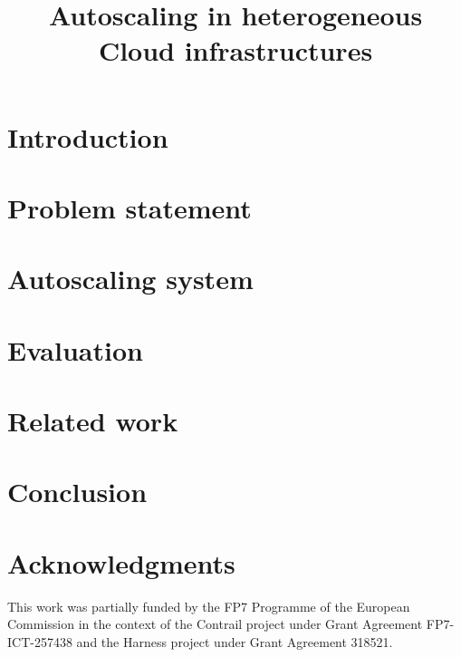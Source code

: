 \documentclass[conference]{IEEEtran}
\begin{document}
\title{Autoscaling in heterogeneous Cloud infrastructures}

\author{
\and
{}
\and
{}
}

\maketitle

\begin{abstract}

\end{abstract}


\section{Introduction}

\label{sec:introduction}

\section{Problem statement}

\label{sec:motivation}

\section{Autoscaling system}
\label{sec:proposed_approach}


\section{Evaluation}
\label{sec:evaluation}


\section{Related work}
\label{sec:relatedWorks}



\section{Conclusion}
\label{sec:conclusion}



\section*{Acknowledgments}

This work was partially funded by the FP7 Programme of the European
Commission in the context of the Contrail project under Grant
Agreement FP7-ICT-257438 and the Harness project under Grant Agreement
318521.




\end{document}
